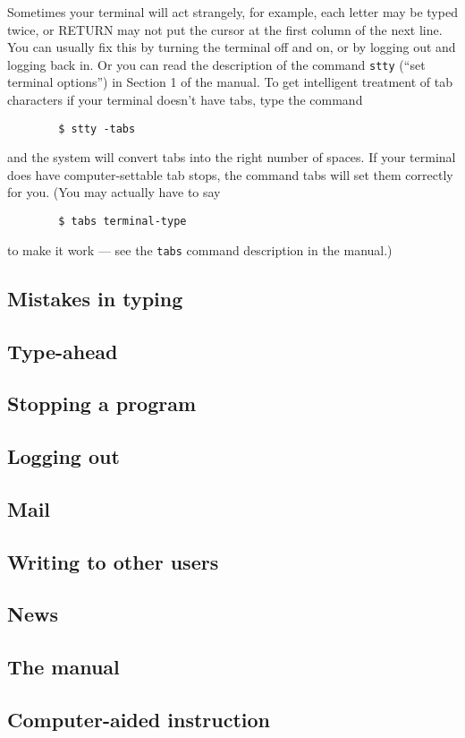 Sometimes your terminal will act strangely, for example, each letter may be
typed twice, or RETURN may not put the cursor at the first column of the next
line. You can usually fix this by turning the terminal off and on, or by logging
out and logging back in. Or you can read the description of the command
\texttt{stty} (``set terminal options'') in Section 1 of the manual. To get
intelligent treatment of tab characters if your terminal doesn't have tabs, type
the command
\begin{verbatim}
        $ stty -tabs
\end{verbatim}
and the system will convert tabs into the right number of spaces. If your
terminal does have computer-settable tab stops, the command tabs will set them
correctly for you. (You may actually have to say
\begin{verbatim}
        $ tabs terminal-type
\end{verbatim}
to make it work --- see the \texttt{tabs} command description in the manual.)


\subsection{Mistakes in typing}
\subsection{Type-ahead}
\subsection{Stopping a program}
\subsection{Logging out}
\subsection{Mail}
\subsection{Writing to other users}
\subsection{News}
\subsection{The manual}
\subsection{Computer-aided instruction}
